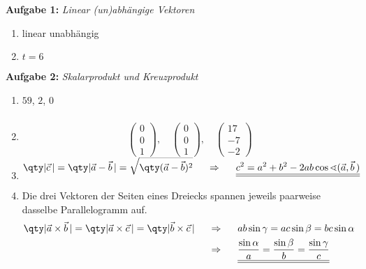 
\textbf{Aufgabe 1: } \emph{Linear (un)abhängige Vektoren}
\begin{enumerate}[label=(\alph*)]
\item linear unabhängig
\item $t=6$
\end{enumerate}
\vspace{0.4cm}
%
\textbf{Aufgabe 2: } \emph{Skalarprodukt und Kreuzprodukt}
\begin{enumerate}[label=(\alph*)]
\item $59$, $2$, $0$
\item \begin{align*} \\[-3.5em]\begin{pmatrix}0\\0\\1\end{pmatrix},\quad\begin{pmatrix}0\\0\\1\end{pmatrix},\quad\begin{pmatrix}17\\-7\\-2\end{pmatrix}\end{align*}
\item \begin{align*} \\[-3.5em]\qty|\vec{c}\,|=\qty|\vec{a}-\vec{b}\,|=\sqrt{\qty(\vec{a}-\vec{b})^2} \hspace{0.5cm}\Rightarrow\hspace{0.5cm}\underline{\underline{c^2=a^2+b^2-2ab\cos\sphericalangle(\vec{a},\vec{b}\,)}}\end{align*}
\item Die drei Vektoren der Seiten eines Dreiecks spannen jeweils paarweise dasselbe Parallelogramm auf.
\begin{align*}
\qty|\vec{a}\times\vec{b}\,|=\qty|\vec{a}\times\vec{c}\,|=\qty|\vec{b}\times\vec{c}\,| \hspace{0.5cm}&\Rightarrow\hspace{0.5cm} ab\sin\gamma=ac\sin\beta=bc\sin\alpha \hspace{0.5cm}\\
&\Rightarrow\hspace{0.5cm}\underline{\underline{\frac{\sin\alpha}{a}=\frac{\sin\beta}{b}=\frac{\sin\gamma}{c}}}
\end{align*}
\end{enumerate}
